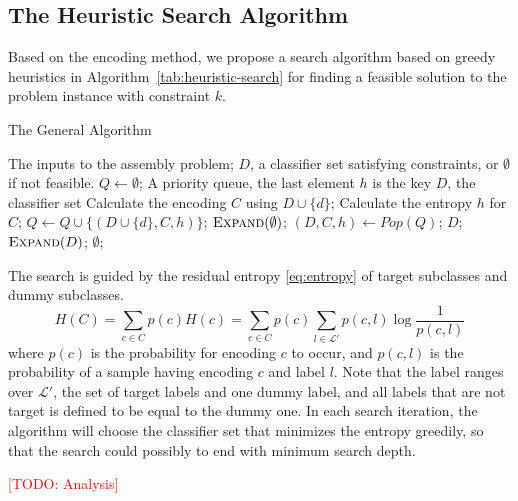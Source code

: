 \documentclass[sigplan,10pt,review]{acmart}\settopmatter{printfolios=true,printccs=false,printacmref=false}
\newcommand{\todo}[1]{\textcolor{red}{[TODO: #1]}}
\begin{document}
\subsection{The Heuristic Search Algorithm}
\label{sec:assembly-algorithm}
Based on the encoding method, we propose a search algorithm based on greedy heuristics in Algorithm~\ref{tab:heuristic-search} for finding a feasible solution to the problem instance with constraint $k$.

\begin{algorithm}
	\caption{The General Algorithm}
	\label{tab:heuristic-search}
	\begin{algorithmic}[1]
		\Require The inputs to the assembly problem;
		\Ensure $D$, a classifier set satisfying constraints, or $\emptyset$ if not feasible.
		\State $Q \gets \emptyset$; \Comment A priority queue, the last element $h$ is the key
		 \Comment $D$, the classifier set
				\State Calculate the encoding $C$ using $D \cup \{d\}$;
				\State Calculate the entropy $h$ for $C$;
				\State $Q \gets Q \cup \{(D \cup \{d\}, C, h)\}$;
			\EndFor
		\EndFunction
			\State $\Call{Expand}{\emptyset}$;
				\State $(D, C, h) \gets Pop(Q)$;
					\State \Return $D$;
				\EndIf
					\State $\Call{Expand}{D}$;
				\EndIf
			\EndWhile
			\State \Return $\emptyset$;
		\EndFunction
	\end{algorithmic}
\end{algorithm}

The search is guided by the residual entropy \eqref{eq:entropy} of target subclasses and dummy subclasses.
\begin{equation}
	H(C) = \sum_{c \in C} p(c)H(c) = \sum_{c \in C} p(c)\sum_{l \in \mathcal{L}'} p(c, l)\log\frac{1}{p(c, l)}
	\label{eq:entropy}
\end{equation}
where $p(c)$ is the probability for encoding $c$ to occur, and $p(c, l)$ is the probability of a sample having encoding $c$ and label $l$.
Note that the label ranges over $\mathcal{L}'$, the set of target labels and one dummy label, and all labels that are not target is defined to be equal to the dummy one.
In each search iteration, the algorithm will choose the classifier set that minimizes the entropy greedily, so that the search could possibly to end with minimum search depth.

\todo{Analysis}
\end{document}
